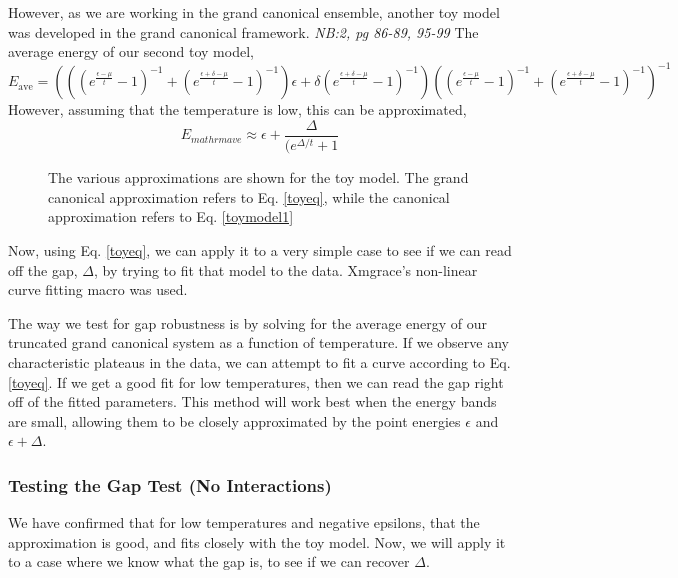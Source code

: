 \documentclass[12pt]{article}
\begin{document}
However, as we are working in the grand canonical ensemble, another toy 
model was developed in the grand canonical framework.
\textit{NB:2, pg 86-89, 95-99} 
The average energy of our second toy model,
\begin{equation}\label{toyeq}
E_{\mathrm{ave}} = \left(  \left(  \left( {e^{{\frac {\epsilon-\mu}{t}}}}-1 \right) ^{-1
}+ \left( {e^{{\frac {\epsilon+\delta-\mu}{t}}}}-1 \right) ^{-1}
 \right) \epsilon+\delta \left( {e^{{\frac {\epsilon+\delta-\mu}{t}}}}
 -1 \right) ^{-1} \right)  \left(  \left( {e^{{\frac {\epsilon-\mu}{t}}
 }}-1 \right) ^{-1}+ \left( {e^{{\frac {\epsilon+\delta-\mu}{t}}}}-1
  \right) ^{-1} \right) ^{-1}
  \end{equation}
However, assuming that the temperature is low, this can be approximated,
\begin{equation}
E_{mathrm{ave}} \approx \epsilon + \frac{\Delta}{(e^{\Delta/t}+1}
\end{equation}

\begin{figure}[H]
	\centerline{}
	\caption{ The various approximations are shown for the toy model.
          The grand canonical approximation refers to Eq. \eqref{toyeq}, while
          the canonical approximation refers to Eq. \eqref{toymodel1}
        }
	\label{energycomfig}
\end{figure}

Now, using Eq. \eqref{toyeq}, we can apply it to a very simple case to
see if we can read off the gap, $\Delta$, by trying to fit that model to
the data.
Xmgrace's non-linear curve fitting macro was used.


The way we test for gap robustness is by solving for the average energy
of our truncated grand canonical system as a function of temperature.
If we observe any characteristic plateaus in the data, we can attempt to
fit a curve according to Eq. \eqref{toyeq}. 
If we get a good fit for low temperatures, then we can read the
gap right off of the fitted parameters.
This method will work best when the energy bands are small, allowing
them to be closely approximated by the point energies $\epsilon$ and 
$\epsilon+\Delta$. 
\subsubsection{Testing the Gap Test (No Interactions)}
We have confirmed that for low temperatures and negative epsilons, that the
approximation is good, and fits closely with the toy model. Now, we will
apply it to a case where we know what the gap is, to see if we can recover
$\Delta$.
\end{document}
